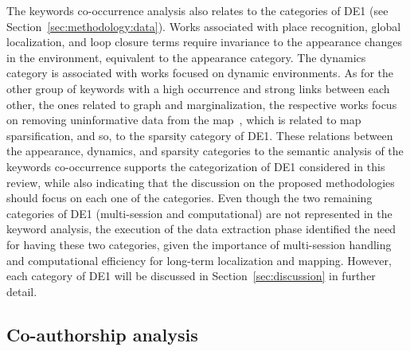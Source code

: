 The keywords co-occurrence analysis also relates to the categories of DE1 (see Section~\ref{sec:methodology:data}). Works associated with place recognition, global localization, and loop closure terms require invariance to the appearance changes in the environment, equivalent to the appearance category. The dynamics category is associated with works focused on dynamic environments. As for the other group of keywords with a high occurrence and strong links between each other, the ones related to graph and marginalization, the respective works focus on removing uninformative data from the map~\parencite{kretzschmar-stachniss:2012:0278364912455072}, which is related to map sparsification, and so, to the sparsity category of DE1. These relations between the appearance, dynamics, and sparsity categories to the semantic analysis of the keywords co-occurrence supports the categorization of DE1 considered in this review, while also indicating that the discussion on the proposed methodologies should focus on each one of the categories. Even though the two remaining categories of DE1 (multi-session and computational) are not represented in the keyword analysis, the execution of the data extraction phase identified the need for having these two categories, given the importance of multi-session handling and computational efficiency for long-term localization and mapping. However, each category of DE1 will be discussed in Section~\ref{sec:discussion} in further detail.


\subsection{Co-authorship analysis}
\label{sec:overview:authors}

